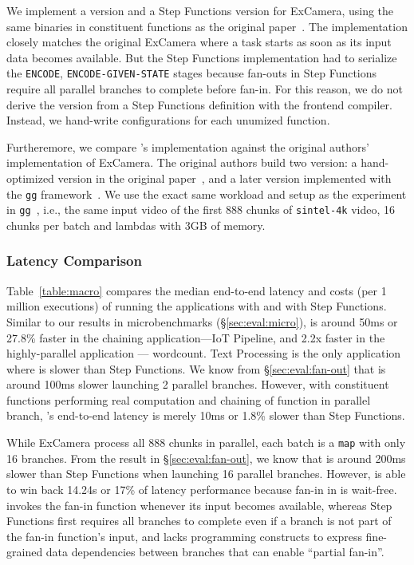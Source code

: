 \begin{itemize}
    We implement a \name{} version and a Step Functions version for ExCamera,
    using the same binaries in constituent functions as the original
    paper~\cite{excamera-binary}. The \name{} implementation closely matches
    the original ExCamera where a task starts as soon as its input data
    becomes available. But the Step Functions implementation had to serialize
    the \texttt{ENCODE}, \texttt{ENCODE-GIVEN-STATE} stages because fan-outs
    in Step Functions require all parallel branches to complete before fan-in.
    For this reason, we do not derive the \name{} version from a Step
    Functions definition with the frontend compiler. Instead, we hand-write
	\name{} configurations for each unumized function.
	
    Furtheremore, we compare \name{}'s implementation against the original
    authors' implementation of ExCamera. The original authors build two
    version: a hand-optimized version in the original paper~\cite{excamera},
    and a later version implemented with the \texttt{gg}
    framework~\cite{gg-atc}. We use the exact same workload and setup as the
    experiment in \texttt{gg}~\cite{gg-atc}, i.e., the same input video of the
    first 888 chunks of \texttt{sintel-4k} video, 16 chunks per batch and
    lambdas with 3GB of memory.
	
\end{itemize}

\subsubsection{Latency Comparison}

Table~\ref{table:macro} compares the median end-to-end latency and costs (per 1
million executions) of running the applications with \name{} and with Step
Functions. Similar to our results in microbenchmarks (\S\ref{sec:eval:micro}),
\name{} is around 50ms or 27.8\% faster in the chaining application---IoT
Pipeline, and 2.2x faster in the highly-parallel application --- wordcount.
Text Processing is the only application where \name{} is slower than Step
Functions. We know from \S\ref{sec:eval:fan-out} that \name{} is around 100ms
slower launching 2 parallel branches. However, with constituent  functions
performing real computation and chaining of function in parallel branch,
\name{}'s end-to-end latency is merely 10ms or 1.8\% slower than Step
Functions.

While ExCamera process all 888 chunks in parallel, each batch is a
\texttt{map} with only 16 branches. From the result in
\S\ref{sec:eval:fan-out}, we know that \name{} is around 200ms slower than
Step Functions when launching 16 parallel branches. However, \name{} is able
to win back 14.24s or 17\% of latency performance because fan-in in \name{} is
wait-free. \name{} invokes the fan-in function whenever its input becomes
available, whereas Step Functions first requires all branches to complete even
if a branch is not part of the fan-in function's input, and lacks programming
constructs to express fine-grained data dependencies between branches that can
enable ``partial fan-in''.

